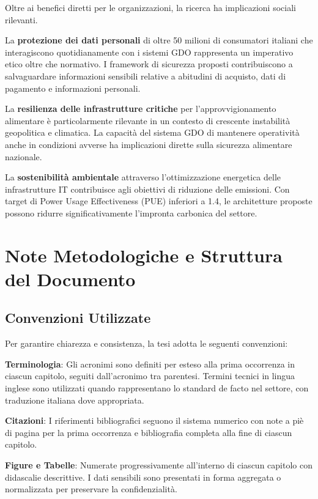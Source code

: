 Oltre ai benefici diretti per le organizzazioni, la ricerca ha implicazioni sociali rilevanti.

La \textbf{protezione dei dati personali} di oltre 50 milioni di consumatori italiani che interagiscono quotidianamente con i sistemi GDO rappresenta un imperativo etico oltre che normativo. I framework di sicurezza proposti contribuiscono a salvaguardare informazioni sensibili relative a abitudini di acquisto, dati di pagamento e informazioni personali.

La \textbf{resilienza delle infrastrutture critiche} per l'approvvigionamento alimentare è particolarmente rilevante in un contesto di crescente instabilità geopolitica e climatica. La capacità del sistema GDO di mantenere operatività anche in condizioni avverse ha implicazioni dirette sulla sicurezza alimentare nazionale.

La \textbf{sostenibilità ambientale} attraverso l'ottimizzazione energetica delle infrastrutture IT contribuisce agli obiettivi di riduzione delle emissioni. Con target di Power Usage Effectiveness (PUE) inferiori a 1.4, le architetture proposte possono ridurre significativamente l'impronta carbonica del settore.

\section{Note Metodologiche e Struttura del Documento}

\subsection{Convenzioni Utilizzate}

Per garantire chiarezza e consistenza, la tesi adotta le seguenti convenzioni:

\textbf{Terminologia}: Gli acronimi sono definiti per esteso alla prima occorrenza in ciascun capitolo, seguiti dall'acronimo tra parentesi. Termini tecnici in lingua inglese sono utilizzati quando rappresentano lo standard de facto nel settore, con traduzione italiana dove appropriata.

\textbf{Citazioni}: I riferimenti bibliografici seguono il sistema numerico con note a piè di pagina per la prima occorrenza e bibliografia completa alla fine di ciascun capitolo.

\textbf{Figure e Tabelle}: Numerate progressivamente all'interno di ciascun capitolo con didascalie descrittive. I dati sensibili sono presentati in forma aggregata o normalizzata per preservare la confidenzialità.

